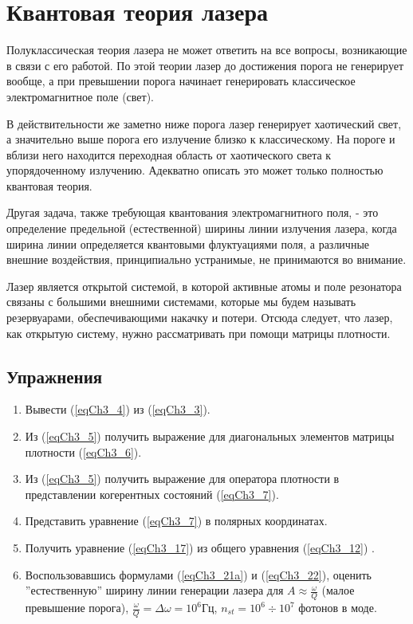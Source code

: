 \chapter{Квантовая теория лазера}

Полуклассическая теория лазера не может ответить на все вопросы,
возникающие в связи с его работой. По этой теории лазер до достижения
порога  не генерирует вообще, а при превышении порога начинает
генерировать классическое электромагнитное поле (свет). 

В действительности же заметно ниже порога лазер генерирует хаотический
свет, а значительно выше порога его излучение близко к
классическому. На пороге и вблизи него находится переходная область от
хаотического света к упорядоченному излучению. Адекватно описать это
может только полностью квантовая теория. 

Другая задача, также требующая квантования электромагнитного поля, -
это определение предельной (естественной) ширины линии излучения
лазера, когда ширина линии определяется квантовыми флуктуациями поля,
а различные внешние воздействия, принципиально устранимые, не
принимаются во внимание. 

Лазер является открытой системой, в которой активные атомы и поле
резонатора связаны с большими внешними системами, которые мы будем
называть резервуарами, обеспечивающими накачку и потери. 
Отсюда следует, что лазер, как открытую систему, нужно рассматривать
при помощи матрицы плотности.  






\section{Упражнения}
\begin{enumerate}
\item Вывести (\ref{eqCh3_4}) из (\ref{eqCh3_3}).
\item Из (\ref{eqCh3_5}) получить выражение для диагональных элементов
  матрицы плотности (\ref{eqCh3_6}).
\item Из (\ref{eqCh3_5}) получить выражение для оператора плотности в
  представлении когерентных состояний (\ref{eqCh3_7}).
\item Представить уравнение (\ref{eqCh3_7}) в полярных координатах.
\item Получить уравнение (\ref{eqCh3_17}) из общего уравнения
  (\ref{eqCh3_12}) .
\item Воспользовавшись формулами (\ref{eqCh3_21a}) и (\ref{eqCh3_22}),
  оценить ''естественную'' ширину линии генерации лазера для $A
  \approx \frac{\omega}{Q}$ (малое превышение порога), 
$\frac{\omega}{Q} = \Delta \omega = 10^6 \mbox{Гц}$, 
$n_{st} = 10^6 \div 10^7$ фотонов в моде. 
\end{enumerate}

